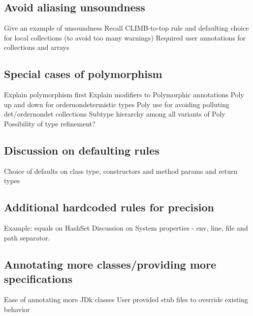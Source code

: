 \subsection{Avoid aliasing unsoundness}
Give an example of unsoundness 
Recall CLIMB-to-top rule and defaulting choice for local collections (to avoid too many warnings)
Required user annotations for collections and arrays

\subsection{Special cases of polymorphism}
Explain polymorphism first
Explain modifiers to Polymorphic annotations
Poly up and down for ordernondetermistic types
Poly use for avoiding polluting det/ordernondet collections
Subtype hierarchy among all variants of Poly
Possibility of type refinement?	

\subsection{Discussion on defaulting rules}
Choice of defaults on class type, constructors and method params and return types

\subsection{Additional hardcoded rules for precision}
Example: equals on HashSet
Discussion on System properties - env, line, file and path separator.

\subsection{Annotating more classes/providing more specifications}
Ease of annotating more JDk classes
User provided stub files to override existing behavior
